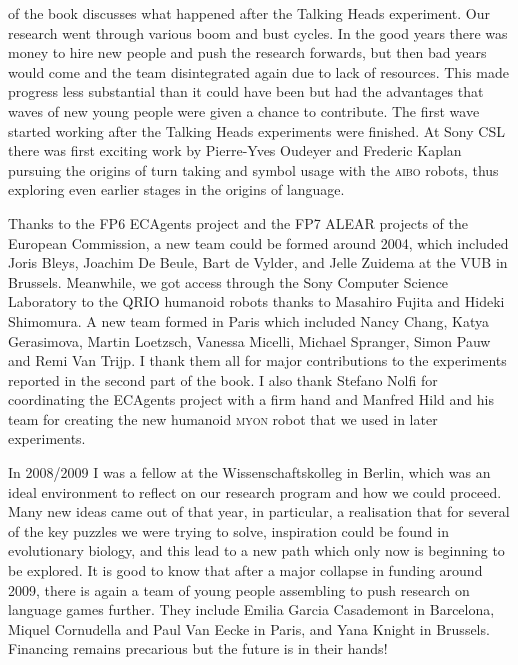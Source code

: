  of the book discusses what happened after the Talking Heads experiment. Our research went through various 
boom and bust cycles. In the good years there was money to hire new people and push the research forwards, but then 
bad years would come and the team disintegrated again due to lack of resources. This made progress less substantial than it
could have been but had the advantages that waves of new young people were given a chance to contribute. The first wave 
started working after the Talking Heads experiments were finished. At Sony CSL there was first exciting work by Pierre-Yves Oudeyer 
and Frederic Kaplan pursuing the origins of turn taking and symbol usage with the \textsc{aibo} robots, thus exploring even earlier 
stages in the origins of language. 

Thanks to the FP6 ECAgents project and the FP7 ALEAR projects of the European Commission, a new 
team could be formed around 2004, which included Joris Bleys, Joachim De Beule, Bart de Vylder, and Jelle Zuidema at the 
VUB in Brussels. Meanwhile, we got access through the Sony Computer Science Laboratory to the QRIO humanoid robots 
thanks to Masahiro Fujita and Hideki Shimomura. A new team formed in Paris which included Nancy Chang, Katya Gerasimova, Martin Loetzsch, 
Vanessa Micelli, Michael Spranger, Simon Pauw and Remi Van Trijp. I thank them all for major contributions to the experiments reported 
in the second part of the book. I also thank Stefano Nolfi for coordinating the ECAgents project with a firm hand 
and Manfred Hild and his team for creating the new humanoid \textsc{myon} robot that we used in later experiments. 

In 2008/2009 I was a fellow at the Wissenschaftskolleg in Berlin, which was an ideal environment to reflect on our research 
program and how we could proceed. Many new ideas came out of that year, in particular, a realisation that for several of the key
puzzles we were trying to solve, inspiration could be found in evolutionary biology, and this lead to a new path which only now 
is beginning to be explored. It is good to know that after a major collapse in funding around 2009, there is 
again a team of young people assembling to push research on language games further. They include Emilia Garcia Casademont in 
Barcelona, Miquel Cornudella and Paul Van Eecke in Paris, and Yana Knight in Brussels. Financing remains precarious 
but the future is in their hands! 

